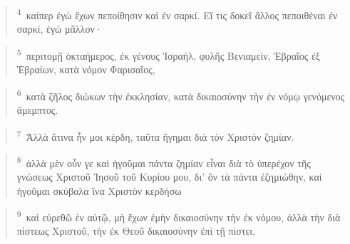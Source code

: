 \documentclass{article}
\newcommand{\currentverse}{1} %
\newcommand{\setcurrentverse}[1]{\renewcommand{\currentverse}{#1}}
\begin{document}
\begin{verse}

\setcurrentverse{4}

\setcounter{footnote}{0}

\textsuperscript{4}~καίπερ ἐγὼ ἔχων πεποίθησιν καὶ ἐν σαρκί. Εἴ τις δοκεῖ ἄλλος πεποιθέναι ἐν σαρκί, ἐγὼ μᾶλλον·

\end{verse}

\begin{verse}

\setcurrentverse{5}

\setcounter{footnote}{0}

\textsuperscript{5}~περιτομῇ ὀκταήμερος, ἐκ γένους Ἰσραήλ, φυλῆς Βενιαμείν, Ἑβραῖος ἐξ Ἑβραίων, κατὰ νόμον Φαρισαῖος,

\end{verse}

\begin{verse}

\setcurrentverse{6}

\setcounter{footnote}{0}

\textsuperscript{6}~κατὰ ζῆλος διώκων τὴν ἐκκλησίαν, κατὰ δικαιοσύνην τὴν ἐν νόμῳ γενόμενος ἄμεμπτος.

\end{verse}

\begin{verse}

\setcurrentverse{7}

\setcounter{footnote}{0}

\textsuperscript{7}~Ἀλλὰ ἅτινα ἦν μοι κέρδη, ταῦτα ἥγημαι διὰ τὸν Χριστὸν ζημίαν.

\end{verse}

\begin{verse}

\setcurrentverse{8}

\setcounter{footnote}{0}

\textsuperscript{8}~ἀλλὰ μὲν οὖν γε καὶ ἡγοῦμαι πάντα ζημίαν εἶναι διὰ τὸ ὑπερέχον τῆς γνώσεως Χριστοῦ Ἰησοῦ τοῦ Κυρίου μου, δι’ ὃν τὰ πάντα ἐζημιώθην, καὶ ἡγοῦμαι σκύβαλα ἵνα Χριστὸν κερδήσω

\end{verse}

\begin{verse}

\setcurrentverse{9}

\setcounter{footnote}{0}

\textsuperscript{9}~καὶ εὑρεθῶ ἐν αὐτῷ, μὴ ἔχων ἐμὴν δικαιοσύνην τὴν ἐκ νόμου, ἀλλὰ τὴν διὰ πίστεως Χριστοῦ, τὴν ἐκ Θεοῦ δικαιοσύνην ἐπὶ τῇ πίστει,

\end{verse}
\end{document}
